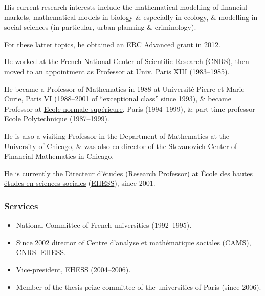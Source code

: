 \documentclass{article}
\begin{document}
His current research interests include the mathematical modelling of financial markets, mathematical models in biology \& especially in ecology, \& modelling in social sciences (in particular, urban planning \& criminology).

For these latter topics, he obtained an \href{http://erc.europa.eu/advanced-grants}{ERC Advanced grant} in 2012.

%
He worked at the French National Center of Scientific Research (\href{https://en.wikipedia.org/wiki/CNRS}{CNRS}), then moved to an appointment as Professor at Univ. Paris XIII (1983--1985).

He became a Professor of Mathematics in 1988 at Université Pierre et Marie Curie, Paris VI (1988--2001 of ``exceptional class'' since 1993), \& became Professor at \href{https://en.wikipedia.org/wiki/Ecole_normale_sup%C3%A9rieure}{Ecole normale supérieure}, Paris (1994--1999), \& part-time professor \href{https://en.wikipedia.org/wiki/Ecole_Polytechnique}{Ecole Polytechnique} (1987--1999).

He is also a visiting Professor in the Department of Mathematics at the University of Chicago, \& was also co-director of the Stevanovich Center of Financial Mathematics in Chicago.

He is currently the Directeur d'études (Research Professor) at \href{https://en.wikipedia.org/wiki/School_for_Advanced_Studies_in_the_Social_Sciences}{École des hautes études en sciences sociales} (\href{https://en.wikipedia.org/wiki/EHESS}{EHESS}), since 2001.

\subsubsection{Services}
\begin{itemize}
	\item National Committee of French universities (1992--1995).
	\item Since 2002 director of Centre d'analyse et mathématique sociales (CAMS), CNRS -EHESS.
	\item Vice-president, EHESS (2004--2006).
	\item Member of the thesis prize committee of the universities of Paris (since 2006).
\end{itemize}
\end{document}
